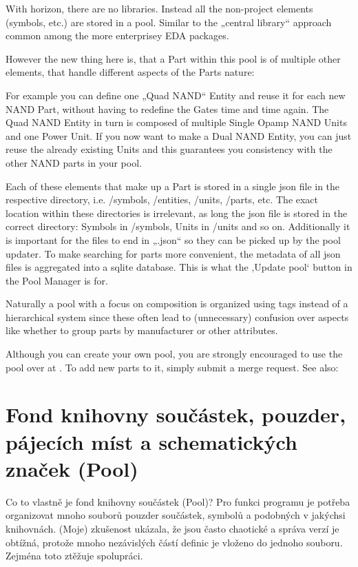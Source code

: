 \documentclass[letterpaper,10pt,czech]{sphinxmanual}
\begin{document}
With horizon, there are no libraries. Instead all the non-project elements
(symbols, etc.) are stored in a pool. Similar to the „central library“
approach common among the more enterprisey EDA packages.

However the new thing here is, that a Part within this pool is  of
multiple other elements, that handle different aspects of the Parts nature:

\noindent{}

For example you can define one „Quad NAND“ Entity and reuse it for each new
NAND Part, without having to redefine the Gates time and time again. The Quad NAND Entity in turn is composed of multiple Single Opamp NAND Units
and one Power Unit. If you now want to make a Dual NAND Entity, you can just reuse
the already existing Units and this guarantees you consistency with the other NAND
parts in your pool.

Each of these elements that make up a Part is stored in a single json file in the
respective directory, i.e. /symbols, /entities, /units, /parts, etc. The exact location within these directories is irrelevant, as long the json file is stored
in the correct directory: Symbols in /symbols, Units in /units and so on.
Additionally it is important for the files to end in „.json“ so they can be
picked up by the pool updater. To make searching for parts more
convenient, the metadata of all json files is aggregated into a sqlite
database. This is what the ‚Update pool‘ button in the Pool Manager is
for.

Naturally a pool with a focus on composition is organized using tags instead of a hierarchical system since these often lead to (unnecessary) confusion over aspects like whether to group parts by manufacturer or other attributes.

Although you can create your own pool, you are strongly encouraged to use the pool
over at
.
To add new parts to it, simply submit a merge request. See also: {\hyperref[\detokenize{pool-contribute::doc}]{}}


\chapter{Fond knihovny součástek, pouzder, pájecích míst a schematických značek (Pool)}
\label{\detokenize{pool-elements:fond-knihovny-soucastek-pouzder-pajecich-mist-a-schematickych-znacek-pool}}\label{\detokenize{pool-elements::doc}}
Co to vlastně je fond knihovny součástek (Pool)? Pro funkci programu je potřeba organizovat mnoho souborů pouzder součástek, symbolů a podobných v jakýchsi knihovnách. (Moje) zkušenost ukázala, že jsou často chaotické a správa verzí je obtížná, protože mnoho nezávislých částí definic je vloženo do jednoho souboru. Zejména toto ztěžuje spolupráci.
\end{document}
